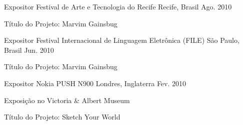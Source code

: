 \begin{cventries}
\cventry
	{Expositor}
	{Festival de Arte e Tecnologia do Recife}
	{Recife, Brasil}
	{Ago. 2010}
	{\begin{cvitems}
		\item{Título do Projeto: Marvim Gainsbug}
	\end{cvitems}}

\cventry
	{Expositor}
	{Festival Internacional de Linguagem Eletrônica (FILE)}
	{São Paulo, Brasil}
	{Jun. 2010}
	{\begin{cvitems}
		\item{Título do Projeto: Marvim Gainsbug}
	\end{cvitems}}

\cventry
	{Expositor}
	{Nokia PUSH N900}
	{Londres, Inglaterra}
	{Fev. 2010}
	{\begin{cvitems}
		\item{Exposição no Victoria \& Albert Museum}
		\item{Título do Projeto: Sketch Your World}
	\end{cvitems}}

\end{cventries}
